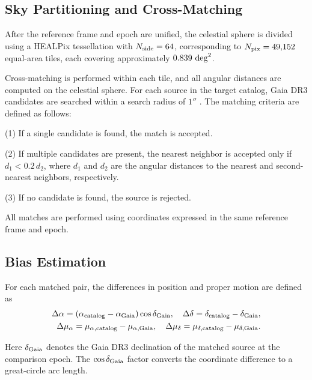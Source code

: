 \documentclass[linenumbers,amsmath,manuscript]{aastex702}
\begin{document}
\subsection{Sky Partitioning and Cross-Matching}

After the reference frame and epoch are unified, the celestial sphere is divided using a HEALPix \citep{Gorski2005} tessellation with $N_{\rm side}=64$, corresponding to $N_{\rm pix}=49{,}152$ equal-area tiles, each covering approximately $0.839\ {\rm deg}^2$.

Cross-matching is performed within each tile, and all angular distances are computed on the celestial sphere. For each source in the target catalog, Gaia DR3 candidates are searched within a search radius of $1''$ \citep{Farnocchia2015}. The matching criteria are defined as follows:

(1) If a single candidate is found, the match is accepted.

(2) If multiple candidates are present, the nearest neighbor is accepted only if $d_1 < 0.2\, d_2$, where $d_1$ and $d_2$ are the angular distances to the nearest and second-nearest neighbors, respectively.

(3) If no candidate is found, the source is rejected.

All matches are performed using coordinates expressed in the same reference frame and epoch.

\subsection{Bias Estimation}

For each matched pair, the differences in position and proper motion are defined as
\begin{equation}
\begin{aligned}
\Delta \alpha = (\alpha_{\rm catalog}-\alpha_{\rm Gaia})\cos\delta_{\rm Gaia},\quad
\Delta \delta = \delta_{\rm catalog}-\delta_{\rm Gaia},\\
\Delta \mu_{\alpha} = \mu_{\alpha,{\rm catalog}}-\mu_{\alpha,{\rm Gaia}},\quad
\Delta \mu_{\delta} = \mu_{\delta,{\rm catalog}}-\mu_{\delta,{\rm Gaia}}.
\end{aligned}
\end{equation}

Here $\delta_{\rm Gaia}$ denotes the Gaia DR3 declination of the matched source at the comparison epoch. The $\cos\delta_{\rm Gaia}$ factor converts the coordinate difference to a great-circle arc length.
\end{document}
